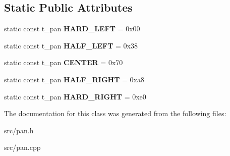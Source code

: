 \subsection*{Static Public Attributes}
\begin{DoxyCompactItemize}
\item 
static const t\+\_\+pan {\bfseries H\+A\+R\+D\+\_\+\+L\+E\+FT} = 0x00\hypertarget{class_pan_a95fa6ee46a027b35dfd6e5ffb036fe4b}{}\label{class_pan_a95fa6ee46a027b35dfd6e5ffb036fe4b}

\item 
static const t\+\_\+pan {\bfseries H\+A\+L\+F\+\_\+\+L\+E\+FT} = 0x38\hypertarget{class_pan_a130bbe5d73cedf467b2dc5d2a57fbeb3}{}\label{class_pan_a130bbe5d73cedf467b2dc5d2a57fbeb3}

\item 
static const t\+\_\+pan {\bfseries C\+E\+N\+T\+ER} = 0x70\hypertarget{class_pan_a64ed1840a2c7177bdef41ea003f0ad70}{}\label{class_pan_a64ed1840a2c7177bdef41ea003f0ad70}

\item 
static const t\+\_\+pan {\bfseries H\+A\+L\+F\+\_\+\+R\+I\+G\+HT} = 0xa8\hypertarget{class_pan_aebf01a7dd3e51abc93d564603e64355e}{}\label{class_pan_aebf01a7dd3e51abc93d564603e64355e}

\item 
static const t\+\_\+pan {\bfseries H\+A\+R\+D\+\_\+\+R\+I\+G\+HT} = 0xe0\hypertarget{class_pan_a21bfb4e28efc12fee5328fefe846474f}{}\label{class_pan_a21bfb4e28efc12fee5328fefe846474f}

\end{DoxyCompactItemize}


The documentation for this class was generated from the following files\+:\begin{DoxyCompactItemize}
\item 
src/pan.\+h\item 
src/pan.\+cpp\end{DoxyCompactItemize}
